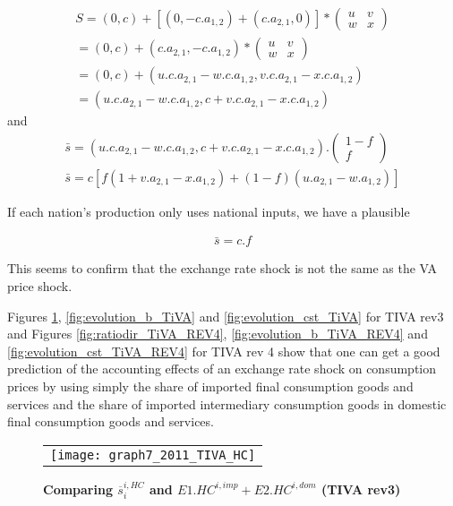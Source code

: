 \documentclass[11pt,a4paper]{article}
\begin{document}
\begin{gather*}
S =\left(0,c\right)+\left[\left(0,-c.a_{1,2}\right)+\left(c.a_{2,1},0\right)\right]*\left(\begin{matrix}u&v\\w&x\end{matrix}\right)
\\
=\left(0,c\right)+\left(c.a_{2,1},-c.a_{1,2}\right)*\left(\begin{matrix}u&v\\w&x\end{matrix}\right)
\\
=\left(0,c\right)+\left(u.c.a_{2,1}-w.c.a_{1,2},v.c.a_{2,1}-x.c.a_{1,2}\right)
\\
=\left(u.c.a_{2,1}-w.c.a_{1,2},c+v.c.a_{2,1}-x.c.a_{1,2}\right)
\end{gather*}
and
\begin{gather*}
\bar{s}=\left(u.c.a_{2,1}-w.c.a_{1,2},c+v.c.a_{2,1}-x.c.a_{1,2}\right).\left(\begin{matrix}1-f\\f\end{matrix}\right)
\\
\bar{s}=c\left[f\left(1+v.a_{2,1}-x.a_{1,2}\right)+\left(1-f\right)\left(u.a_{2,1}-w.a_{1,2}\right)\right]
\end{gather*}


If each nation's production only uses national inputs, we have a plausible

\begin{gather*}
\bar{s}=c.f
\end{gather*}

This seems to confirm that the exchange rate shock is not the same as the VA price shock.


Figures \ref{fig:ratiodir_TiVA}, \ref{fig:evolution_b_TiVA} and \ref{fig:evolution_cst_TiVA} for TIVA rev3 and Figures \ref{fig:ratiodir_TiVA_REV4}, \ref{fig:evolution_b_TiVA_REV4} and \ref{fig:evolution_cst_TiVA_REV4} for TIVA rev 4 show that one can get a good prediction of the accounting effects of an exchange rate shock on consumption prices by using simply the share of imported final consumption goods and services and the share of imported intermediary consumption goods in domestic final consumption goods and services.



\begin{figure}[!h]
	\centering
	\caption{\footnotesize{\textbf{Comparing $\overline{s}_{i}^{i,HC}$ and $E1.HC^{i,imp}+E2.HC^{i,dom}$ (TIVA rev3)}}}
	\begin{tabular}{c}
		\texttt{[image: graph7\_2011\_TIVA\_HC]}\\
	\end{tabular}
	\label{fig:ratiodir_TiVA}
\end{figure}
\end{document}
